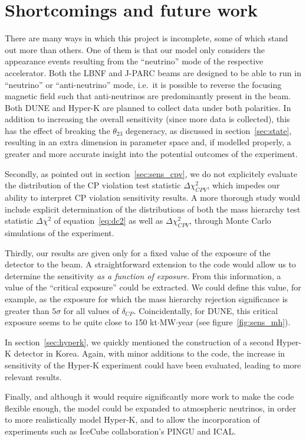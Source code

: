 \section{Shortcomings and future work}
There are many ways in which this project is incomplete, some of which stand
out more than others. 
One of them is that our model only considers the appearance events resulting
from the ``neutrino'' mode of the respective accelerator. Both the LBNF and J-PARC
beams are designed to be able to run in ``neutrino'' or ``anti-neutrino'' mode,
i.e.~it is possible to reverse the focusing magnetic field such that
anti-neutrinos are predominantly present in the beam. Both DUNE and Hyper-K are planned
to collect data under both polarities.
In addition to increasing the overall sensitivity (since more data is
collected), this has the effect of breaking the $\theta_{23}$ degeneracy, as
discussed in section~\ref{sec:state}, resulting in an extra dimension in
parameter space and, if modelled properly, a greater and more accurate insight
into the potential outcomes of the experiment.

Secondly, as pointed out in section~\ref{sec:sens_cpv}, we do not explicitely
evaluate the distribution of the CP violation test statistic
$\Delta\chi^2_{CPV}$, which impedes our ability to interpret CP violation
sensitivity results. A more thorough study would include explicit determination
of the distributions of both the mass hierarchy test statistic $\Delta\chi^2$
of equation~\ref{eq:dc2} as well as $\Delta\chi^2_{CPV}$, through Monte Carlo
simulations of the experiment.

Thirdly, our results are given only for a fixed value of the exposure of the detector to
the beam. A straightforward extension to the code would allow us to determine
the sensitivity \emph{as a function of exposure}. From this information, a
value of the ``critical exposure'' could be extracted.  We could define
this value, for example, as the exposure for which the mass hierarchy
rejection significance is greater than $5\sigma$ for all values of
$\delta_{CP}$. Coincidentally, for DUNE, this critical exposure seems to be
quite close to 150 kt$\cdot$MW$\cdot$year (see figure~\ref{fig:sens_mh}).

In section~\ref{sec:hyperk}, we quickly mentioned the construction of a second
Hyper-K detector in Korea. Again, with minor additions to the code, the
increase in sensitivity of the Hyper-K experiment could have been evaluated, 
leading to more relevant results.

Finally, and although it would require significantly more work to make
the code flexible enough, the model could be expanded to atmospheric neutrinos,
in order to more realistically model Hyper-K, and to allow the incorporation of
experiments such as IceCube collaboration's PINGU and ICAL.



